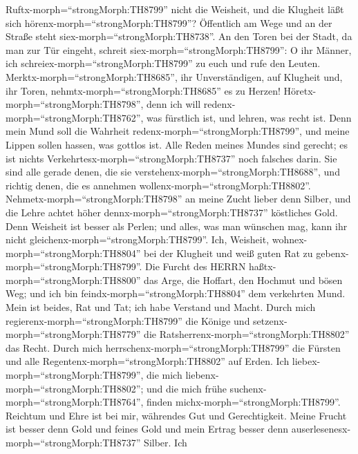  Ruftx-morph=``strongMorph:TH8799'' nicht die Weisheit, und
die Klugheit läßt sich hörenx-morph=``strongMorph:TH8799''? 
Öffentlich am Wege und an der Straße steht
siex-morph=``strongMorph:TH8738''.  An den Toren bei der
Stadt, da man zur Tür eingeht, schreit
siex-morph=``strongMorph:TH8799'':  O ihr Männer, ich
schreiex-morph=``strongMorph:TH8799'' zu euch und rufe den Leuten.
 Merktx-morph=``strongMorph:TH8685'', ihr Unverständigen,
auf Klugheit und, ihr Toren, nehmtx-morph=``strongMorph:TH8685'' es zu
Herzen!  Höretx-morph=``strongMorph:TH8798'', denn ich will
redenx-morph=``strongMorph:TH8762'', was fürstlich ist, und lehren, was
recht ist.  Denn mein Mund soll die Wahrheit
redenx-morph=``strongMorph:TH8799'', und meine Lippen sollen hassen, was
gottlos ist.  Alle Reden meines Mundes sind gerecht; es ist
nichts Verkehrtesx-morph=``strongMorph:TH8737'' noch falsches darin.
 Sie sind alle gerade denen, die sie
verstehenx-morph=``strongMorph:TH8688'', und richtig denen, die es
annehmen wollenx-morph=``strongMorph:TH8802''. 
Nehmetx-morph=``strongMorph:TH8798'' an meine Zucht lieber denn Silber,
und die Lehre achtet höher dennx-morph=``strongMorph:TH8737'' köstliches
Gold.  Denn Weisheit ist besser als Perlen; und alles, was
man wünschen mag, kann ihr nicht gleichenx-morph=``strongMorph:TH8799''.
 Ich, Weisheit, wohnex-morph=``strongMorph:TH8804'' bei der
Klugheit und weiß guten Rat zu gebenx-morph=``strongMorph:TH8799''.
 Die Furcht des HERRN haßtx-morph=``strongMorph:TH8800''
das Arge, die Hoffart, den Hochmut und bösen Weg; und ich bin
feindx-morph=``strongMorph:TH8804'' dem verkehrten Mund. 
Mein ist beides, Rat und Tat; ich habe Verstand und Macht. 
Durch mich regierenx-morph=``strongMorph:TH8799'' die Könige und
setzenx-morph=``strongMorph:TH8779'' die
Ratsherrenx-morph=``strongMorph:TH8802'' das Recht.  Durch
mich herrschenx-morph=``strongMorph:TH8799'' die Fürsten und alle
Regentenx-morph=``strongMorph:TH8802'' auf Erden.  Ich
liebex-morph=``strongMorph:TH8799'', die mich
liebenx-morph=``strongMorph:TH8802''; und die mich frühe
suchenx-morph=``strongMorph:TH8764'', finden
michx-morph=``strongMorph:TH8799''.  Reichtum und Ehre ist
bei mir, währendes Gut und Gerechtigkeit.  Meine Frucht ist
besser denn Gold und feines Gold und mein Ertrag besser denn
auserlesenesx-morph=``strongMorph:TH8737'' Silber.  Ich
